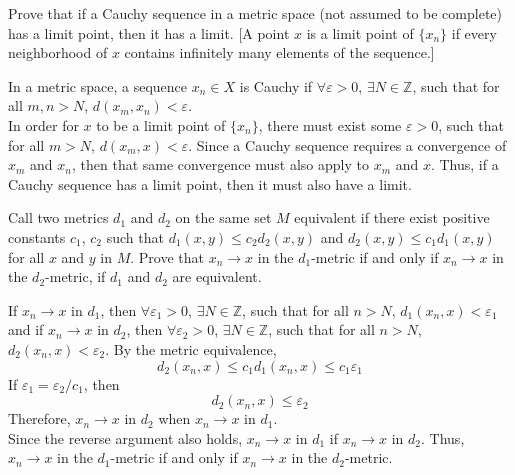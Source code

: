 \documentclass[11pt]{article}
\begin{document}
\makeAssignmentTitle

\begin{homeworkProblem}
    Prove that if a Cauchy sequence in a metric space (not assumed to be complete) has a limit
    point, then it has a limit. [A point $x$ is a limit point of $\{x_n\}$ if every neighborhood
            of $x$ contains infinitely many elements of the sequence.] \\

    \solution

    In a metric space, a sequence $x_n \in X$ is Cauchy if $\forall \varepsilon > 0$, $\exists N \in \mathbb{Z}$, such
    that for all $m,n > N$, $d(x_m, x_n) < \varepsilon$. \\

    In order for $x$ to be a limit point of $\{x_n\}$, there must exist some $\varepsilon > 0$, such that for all $m > N$, $d(x_m, x) < \varepsilon$.
    Since a Cauchy sequence requires a convergence of $x_m$ and $x_n$, then that same convergence must also apply to $x_m$ and $x$. Thus,
    if a Cauchy sequence has a limit point, then it must also have a limit.



\end{homeworkProblem}

\pagebreak

\begin{homeworkProblem}
    Call two metrics $d_1$ and $d_2$ on the same set $M$ equivalent if there exist positive constants
    $c_1$, $c_2$ such that $d_1(x, y) \leq c_2 d_2(x, y)$ and $d_2(x, y) \leq c_1 d_1(x, y)$ for all $x$ and $y$ in $M$. Prove
    that $x_n \to x$ in the $d_1$-metric if and only if $x_n \to x$ in the $d_2$-metric, if $d_1$ and $d_2$ are equivalent. \\

    \solution

    If $x_n \to x$ in $d_1$, then $\forall \varepsilon_1 > 0$, $\exists N \in \mathbb{Z}$, such that for all
    $n > N$, $d_1(x_n, x) < \varepsilon_1$ and if $x_n \to x$ in $d_2$, then $\forall \varepsilon_2 > 0$, $\exists N \in \mathbb{Z}$,
    such that for all $n > N$, $d_2(x_n, x) < \varepsilon_2$. By the metric equivalence,
    \[
        d_2(x_n, x) \leq c_1 d_1(x_n, x) \leq c_1 \varepsilon_1
    \]
    If $\varepsilon_1 = \varepsilon_2 / c_1$, then
    \[
        d_2(x_n, x) \leq \varepsilon_2
    \]
    Therefore, $x_n \to x$ in $d_2$ when $x_n \to x$ in $d_1$. \\

    Since the reverse argument also holds, $x_n \to x$ in $d_1$ if $x_n \to x$ in $d_2$. Thus, $x_n \to x$ in the $d_1$-metric if and only if $x_n \to x$ in the $d_2$-metric.
\end{homeworkProblem}
\end{document}
